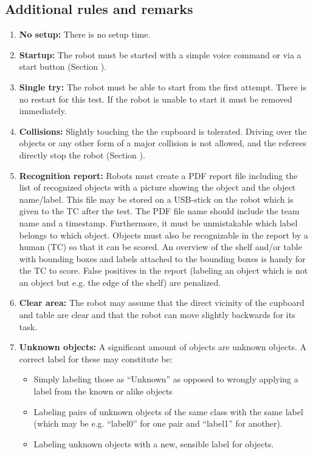 \subsection{Additional rules and remarks}
\begin{enumerate}
\item \textbf{No setup:} There is no setup time.
\item \textbf{Startup:} The robot must be started with a simple voice command or via a start button (Section ). 
\item \textbf{Single try:} The robot must be able to start from the first attempt. There is no restart for this test. If the robot is unable to start it must be removed immediately.
\item \textbf{Collisions:} Slightly touching the the cupboard is tolerated.
  Driving over the objects or any other form of a major collision is not allowed, and the referees directly stop the robot (Section ).
\item \textbf{Recognition report:} Robots must create a PDF report file including the list of recognized objects with a picture showing the object and the object name/label.
  This file may be stored on a USB-stick on the robot which is given to the TC after the test. The PDF file name should include the team name and a timestamp. 
  Furthermore, it must be unmistakable which label belongs to which object. Objects must also be recognizable in the report by a human (TC) so that it can be scored. 
  An overview of the shelf and/or table with bounding boxes and labels attached to the bounding boxes is handy for the TC to score.
  False positives in the report (labeling an object which is not an object but e.g. the edge of the shelf) are penalized.
  \item \textbf{Clear area: } The robot may assume that the direct vicinity of the cupboard and table are clear and that the robot can move slightly backwards for its task.
  \item \textbf{Unknown objects:} A significant amount of objects are unknown objects. A correct label for these may constitute be: 
  \begin{itemize}
   \item Simply labeling those as ``Unknown'' as opposed to wrongly applying a label from the known or alike objects
   \item Labeling pairs of unknown objects of the same class with the same label (which may be e.g. ``label0'' for one pair and ``label1'' for another). 
   \item Labeling unknown objects with a new, sensible label for objects.
  \end{itemize}
\end{enumerate}

